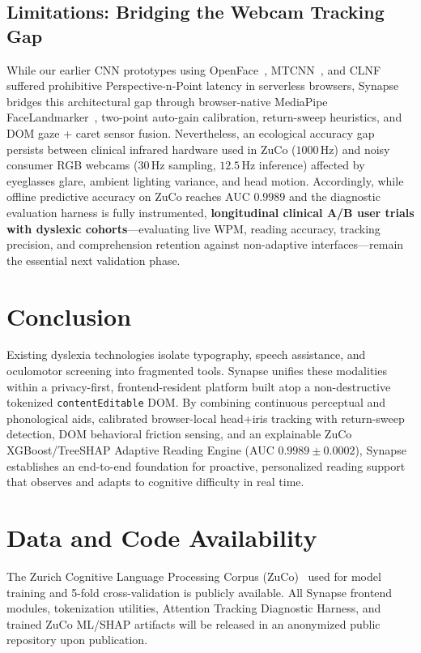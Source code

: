 \documentclass[conference]{IEEEtran}
\begin{document}
\subsection{Limitations: Bridging the Webcam Tracking Gap}
While our earlier CNN prototypes using OpenFace~\cite{20}, MTCNN~\cite{21}, and CLNF~\cite{22} suffered prohibitive Perspective-n-Point latency in serverless browsers, Synapse bridges this architectural gap through browser-native MediaPipe FaceLandmarker~\cite{16}, two-point auto-gain calibration, return-sweep heuristics, and DOM gaze + caret sensor fusion. Nevertheless, an ecological accuracy gap persists between clinical infrared hardware used in ZuCo ($1000$\,Hz) and noisy consumer RGB webcams ($30$\,Hz sampling, $12.5$\,Hz inference) affected by eyeglasses glare, ambient lighting variance, and head motion. Accordingly, while offline predictive accuracy on ZuCo reaches AUC $0.9989$ and the diagnostic evaluation harness is fully instrumented, \textbf{longitudinal clinical A/B user trials with dyslexic cohorts}---evaluating live WPM, reading accuracy, tracking precision, and comprehension retention against non-adaptive interfaces---remain the essential next validation phase.

\section{Conclusion}

Existing dyslexia technologies isolate typography, speech assistance, and oculomotor screening into fragmented tools. Synapse unifies these modalities within a privacy-first, frontend-resident platform built atop a non-destructive tokenized \texttt{contentEditable} DOM. By combining continuous perceptual and phonological aids, calibrated browser-local head+iris tracking with return-sweep detection, DOM behavioral friction sensing, and an explainable ZuCo XGBoost/TreeSHAP Adaptive Reading Engine (AUC $0.9989 \pm 0.0002$), Synapse establishes an end-to-end foundation for proactive, personalized reading support that observes and adapts to cognitive difficulty in real time.

\section*{Data and Code Availability}
The Zurich Cognitive Language Processing Corpus (ZuCo)~\cite{17} used for model training and 5-fold cross-validation is publicly available. All Synapse frontend modules, tokenization utilities, Attention Tracking Diagnostic Harness, and trained ZuCo ML/SHAP artifacts will be released in an anonymized public repository upon publication.
\end{document}
